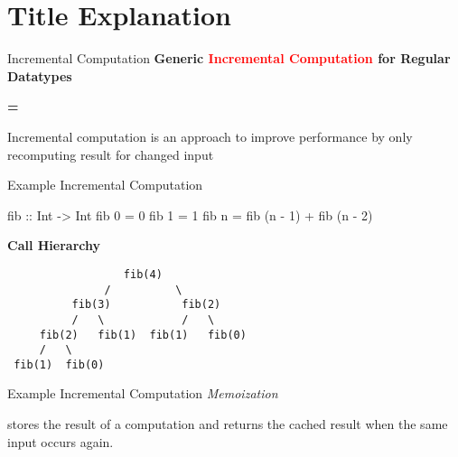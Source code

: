 \section{Title Explanation}


\begin{slide}{Incremental Computation}
\centering
\large \textbf{Generic \textcolor{red}{Incremental Computation} for Regular Datatypes}

\vspace*{.5cm}
\textbf{=}
\vspace*{.5cm}

Incremental computation is an approach to improve performance by only recomputing result for changed input

\end{slide}


\begin{slide}{Example Incremental Computation}
\begin{haskell}
fib :: Int -> Int
fib 0 = 0
fib 1 = 1
fib n = fib (n - 1) + fib (n - 2)
\end{haskell}
\begin{center}  
\textbf{Call Hierarchy}

\vspace*{.2cm}
\begin{verbatim}
                  fib(4)  
               /          \
          fib(3)           fib(2)
          /   \            /   \
     fib(2)   fib(1)  fib(1)   fib(0)
     /   \
 fib(1)  fib(0)
\end{verbatim}
\end{center}
\end{slide}

\begin{slide}{Example Incremental Computation}
\centering
{\huge \textit{Memoization}}

\vspace*{0.4cm}

stores the result of a computation and returns the cached result when the same input occurs again.

\end{slide}

